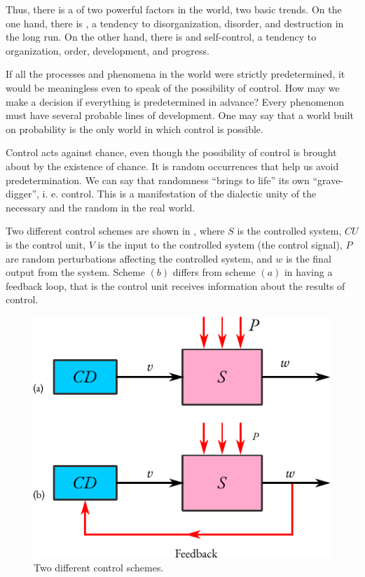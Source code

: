 Thus, there is a  of two powerful factors in the world,
two basic trends. On the one hand, there is , a tendency to
disorganization, disorder, and destruction in the long run. On the other
hand, there is  and self-control, a tendency to organization, order, development, and progress.

 If all the processes and
phenomena in the world were strictly predetermined, it would be
meaningless even to speak of the possibility of control.  How may we make
a decision if everything is predetermined in advance? Every
phenomenon must have several probable lines of development. One may
say that a world built on probability is the only world in which control
is possible.

Control acts against chance, even though the possibility of control is
brought about by the existence of chance. It is random occurrences that
help us avoid predetermination. We can say that randomness ``brings to
life'' its own ``grave-digger'', i. e. control. This is a manifestation of the
dialectic unity of the necessary and the random in the real world.

 Two different control schemes are shown in
 , where $S$ is the controlled system, $CU$ is the control unit, $V$ is the input to the controlled system (the control signal), $P$ are random perturbations affecting the controlled system, and $w$ is the final output
from the system. Scheme $(b)$ differs from scheme $(a)$ in having a feedback
loop, that is the control unit receives information about the results of
control.
\begin{figure}[!ht]
 \centering
 \includegraphics[width=0.75\linewidth]{figures/control-scheme-1.pdf}
\caption{Two different control schemes.\label{control-scheme-1}}
 \end{figure}

